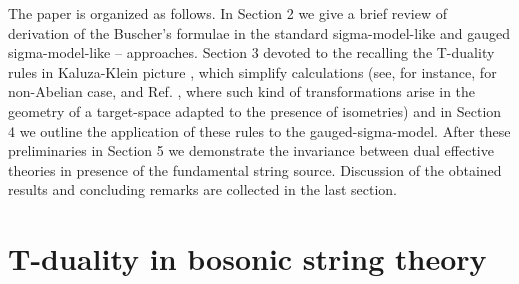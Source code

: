 \documentclass[a4paper,11pt]{article}
\begin{document}
The paper is organized as follows. In Section 2 we give a brief
review of derivation of the Buscher's formulae in the standard
sigma-model-like \cite{buscher} and gauged sigma-model-like 
\cite{hs0}--\cite{ps} approaches. Section
3 devoted to the recalling the T-duality rules in 
Kaluza-Klein picture \cite{bek,bko}, which simplify calculations
(see, for instance, \cite{bm} for non-Abelian case, and Ref. \cite{borlaf}, 
where
such kind of transformations arise in the geometry of a target-space adapted to
the presence of isometries)
and in Section 4 we outline the application of
these rules to the
gauged-sigma-model. After these preliminaries in Section 5 we
demonstrate the invariance between dual effective theories in 
presence of the fundamental string source. Discussion of the
obtained results and concluding remarks are
collected in the last section.






\section{T-duality in bosonic string theory}
\end{document}
